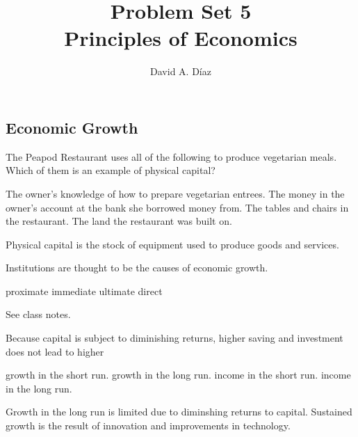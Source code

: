 \documentclass[addpoints,11pt]{exam}
\theoremstyle{definition}
\newcommand{\dd}[1]{}
\newcommand{\blank}[0]{\underline{\hspace{3cm}}}
\begin{document}
	\title{\textbf{Problem Set 5 \dd{Answers and Selected Solutions}} \\ \vspace{2 mm} {\large Principles of Economics}}
	\author{David A. D\'iaz}
	\date{}
	\maketitle

\subsection*{Economic Growth}

\begin{questions}
	
	\question The Peapod Restaurant uses all of the following to produce vegetarian meals. Which of
	them is an example of physical capital?
	
	\begin{choices}
		\choice The owner's knowledge of how to prepare vegetarian entrees.
		\choice The money in the owner's account at the bank she borrowed money from.
		\CorrectChoice The tables and chairs in the restaurant.
		\choice The land the restaurant was built on.
	\end{choices}
	
	\begin{solution}
		Physical capital is the stock of equipment used to produce goods and services.
	\end{solution}
	
	\question Institutions are thought to be the \blank causes of economic growth.
	
	\begin{choices}
		\choice proximate 
		\choice immediate 
		\CorrectChoice ultimate
		\choice direct
	\end{choices}
	
	\begin{solution}
		See class notes.
	\end{solution}
	
	
	\question Because capital is subject to diminishing returns, higher saving and investment does not lead to higher
	
	\begin{choices}
		\choice growth in the short run.
		\CorrectChoice growth in the long run.
		\choice income in the short run.
		\choice income in the long run.
	\end{choices}
	
	\begin{solution}
		Growth in the long run is limited due to diminshing returns to capital. Sustained growth is the result of innovation and improvements in technology.
	\end{solution}
	

\end{questions}
\end{document}
